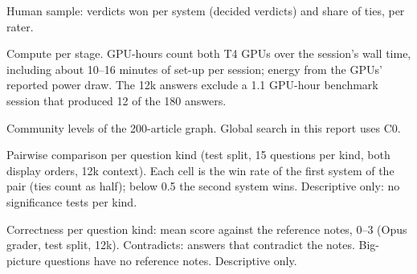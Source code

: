 \documentclass{article}
\begin{document}
\begin{table}[h]
\caption{Human sample: verdicts won per system (decided verdicts) and share of ties, per rater.}
\label{tab:humanwins}
\vskip 0.05in
\begin{center}\begin{small}

\end{small}\end{center}
\end{table}

\begin{table}[h]
\caption{Compute per stage. GPU-hours count both T4 GPUs over the session's wall time, including about
10--16 minutes of set-up per session; energy from the GPUs' reported power draw. The 12k answers exclude
a 1.1 GPU-hour benchmark session that produced 12 of the 180 answers.}
\label{tab:compute}
\vskip 0.05in
\begin{center}\begin{small}

\end{small}\end{center}
\end{table}

\begin{table}[h]
\caption{Community levels of the 200-article graph. Global search in this report uses C0.}
\label{tab:levels}
\vskip 0.05in
\begin{center}\begin{small}

\end{small}\end{center}
\end{table}

\begin{table}[t]
\caption{Pairwise comparison per question kind (test split, 15 questions per kind, both display orders,
12k context). Each cell is the win rate of the first system of the pair (ties count as half); below 0.5 the
second system wins. Descriptive only: no significance tests per kind.}
\label{tab:judgebykind}
\vskip 0.05in
\begin{center}\begin{small}

\end{small}\end{center}
\end{table}

\begin{table}[h]
\caption{Correctness per question kind: mean score against the reference notes, 0--3 (Opus grader,
test split, 12k). Contradicts: answers that contradict the notes. Big-picture questions have no
reference notes. Descriptive only.}
\label{tab:correctnessbykind}
\vskip 0.05in
\begin{center}\begin{small}

\end{small}\end{center}
\end{table}
\end{document}
